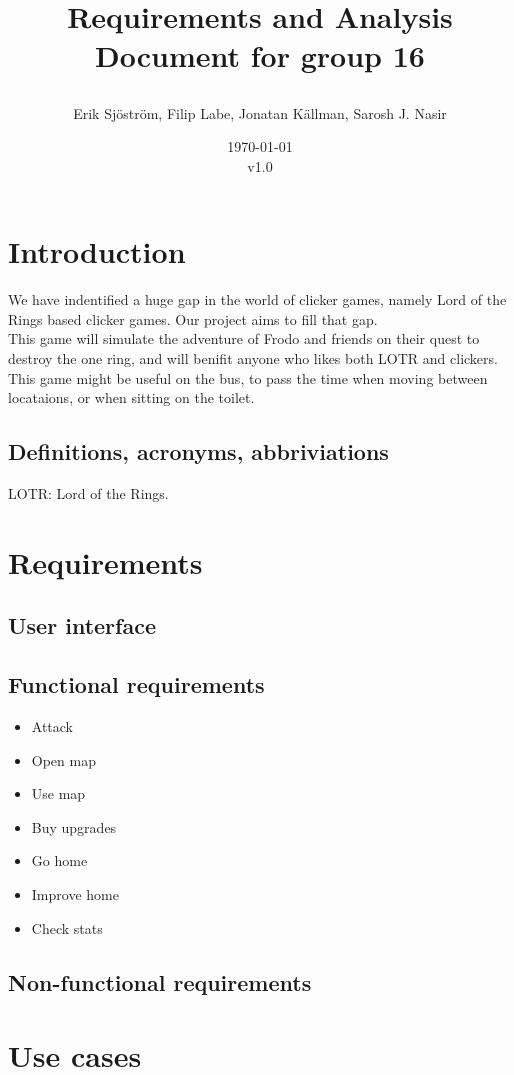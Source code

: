 \documentclass{article}
\title{
    Requirements and Analysis Document for group 16
    \author{Erik Sjöström,
            Filip Labe,
            Jonatan Källman,
            Sarosh J. Nasir}
    \date{\today \\v1.0}         
}
\begin{document}
\maketitle

\section{Introduction}
We have indentified a huge gap in the world of clicker games, namely 
Lord of the Rings based clicker games. Our project aims to fill that gap. \\
This game will simulate the adventure of Frodo and friends on their quest to
destroy the one ring, and will benifit anyone who likes both LOTR and clickers.\\
This game might be useful on the bus, to pass the time when moving between locataions, or when sitting on the toilet. 

\subsection{Definitions, acronyms, abbriviations}
LOTR: Lord of the Rings.

\section{Requirements}
\subsection{User interface}
\subsection{Functional requirements}
\begin{itemize}
    \item Attack
    \item Open map
    \item Use map
    \item Buy upgrades
    \item Go home
    \item Improve home
    \item Check stats
\end{itemize}
\subsection{Non-functional requirements}
\section{Use cases}
\end{document}
